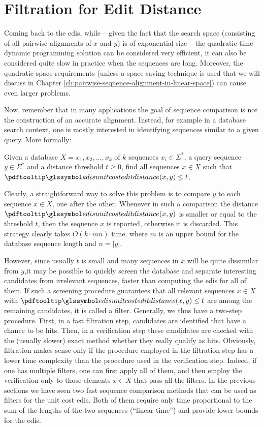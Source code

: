 \section{Filtration for Edit Distance}\label{sec:filtration-for-edit-distance}
Coming back to the \gls{edis}, while – given the fact that the search space (consisting
of all pairwise alignments of $x$ and $y$) is of exponential size – the quadratic time dynamic
programming solution can be considered very efficient, it can also be considered quite
slow in practice when the sequences are long.
Moreover, the quadratic space requirements
(unless a space-saving technique is used that we will discuss in Chapter \ref{ch:pairwise-sequence-alignment-in-linear-space}) can cause even
larger problems. %

Now, remember that in many applications the goal of sequence comparison is not the
construction of an accurate alignment.
Instead, for example in a database search context,
one is mostly interested in identifying sequences similar to a given query.
More formally:

\begin{prob}
    Given a database $X = {x_1 , x_2 , \dots , x_k }$ of $k$ sequences $x_i \in \Sigma^*$,
    a query sequence $y \in \Sigma^*$ and a distance threshold $t \geq 0$, find all
    sequences $x \in X$ such that $\edis(x, y) \leq t$.
\end{prob}

Clearly, a straightforward way to solve this problem is to compare $y$ to each sequence
$x \in X$, one after the other.
Whenever in such a comparison the distance $\edis(x, y)$ is smaller
or equal to the threshold $t$, then the sequence $x$ is reported, otherwise it is discarded.
This strategy clearly takes $O(k \cdot mn)$ time, where $m$ is an upper bound for the database
sequence length and $n = |y|$.

However, since usually $t$ is small and many sequences in $x$ will be quite dissimilar from
$y$,it may be possible to quickly screen the database and separate interesting candidates
from irrelevant sequences, faster than computing the \gls{edis} for all of them.
If such
a screening procedure guarantees that all relevant sequences $x \in X$ with $\edis(x, y) \leq t$ are
among the remaining candidates, it is called a filter.
Generally, we thus have a two-step procedure.
First, in a fast filtration step, candidates
are identified that have a chance to be hits.
Then, in a verification step these candidates
are checked with the (usually slower) exact method whether they really qualify as hits.
Obviously, filtration makes sense only if the procedure employed in the filtration step has
a lower time complexity than the procedure used in the verification step.
Indeed, if one has multiple filters, one can first apply all of them, and then employ the
verification only to those elements $x \in X$ that pass all the filters.
In the previous sections we have seen two fast sequence comparison methods that can be
used as filters for the unit cost \gls{edis}.
Both of them require only time proportional
to the sum of the lengths of the two sequences (“linear time”) and provide lower bounds
for the \gls{edis}.

